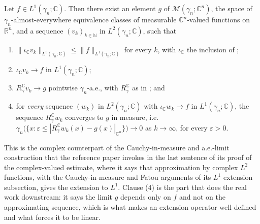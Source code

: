 \begin{lemma}
Let $f \in L^1(\gamma_n;\mathbb{C})$.  Then there exist an element $g$ of
$\mathcal{M}(\gamma_n;\mathbb{C}^n)$, the space of $\gamma_n$-almost-everywhere
equivalence classes of measurable $\mathbb{C}^n$-valued functions on
$\mathbb{R}^n$, and a sequence $(v_k)_{k\in\mathbb{N}}$ in
$L^2(\gamma_n;\mathbb{C})$, such that
\begin{enumerate}
\item $\|\iota_{\mathbb{C}} v_k\|_{L^1(\gamma_n;\mathbb{C})}
  \leq \|f\|_{L^1(\gamma_n;\mathbb{C})}$ for every $k$, with $\iota_{\mathbb{C}}$
  the inclusion of ;
\item $\iota_{\mathbb{C}} v_k \to f$ in $L^1(\gamma_n;\mathbb{C})$;
\item $R_\gamma^{\mathbb{C}} v_k \to g$ pointwise $\gamma_n$-a.e., with
  $R_\gamma^{\mathbb{C}}$ as in ; and
\item for \emph{every} sequence $(w_k)$ in $L^2(\gamma_n;\mathbb{C})$ with
  $\iota_{\mathbb{C}} w_k \to f$ in $L^1(\gamma_n;\mathbb{C})$, the sequence
  $R_\gamma^{\mathbb{C}} w_k$ converges to $g$ in measure, i.e.
  $\gamma_n\bigl(\{x : \varepsilon \leq |R_\gamma^{\mathbb{C}} w_k(x)
    - g(x)|_{\mathbb{C}^n}\}\bigr) \to 0$ as $k \to \infty$, for every
  $\varepsilon > 0$.
\end{enumerate}

This is the complex counterpart of the Cauchy-in-measure and a.e.-limit
construction that the reference paper invokes in the last sentence of its proof
of the complex-valued estimate, where it says that approximation by complex
$L^2$ functions, with the Cauchy-in-measure and Fatou arguments of its $L^1$
extension subsection, gives the extension to $L^1$.  Clause (4) is the part that
does the real work downstream: it says the limit $g$ depends only on $f$ and not
on the approximating sequence, which is what makes an extension operator
well defined and what forces it to be linear.
\end{lemma}
